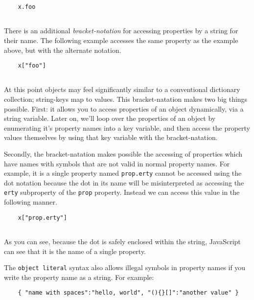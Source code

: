 \documentclass[11pt,letter]{book}
\begin{document}
    \begin{verbatim}
    x.foo
    
    \end{verbatim}
    
    There is an additional \emph{bracket-notation} for accessing properties by a string for their 
    name. The following example accesses the same property as the example above, but with the 
    alternate notation.
    
    \begin{verbatim}
    x["foo"]
    
    \end{verbatim}
    
    At this point objects may feel significantly similar to a conventional dictionary collection;
    string-keys map to values. This bracket-natation makes two big things possible. First: it allows 
    you to access properties of an object dynamically, via a string variable. Later on, we'll loop
    over the properties of an object by enumerating it's property names into a key variable, and 
    then access the property values themselves by using that key variable with the bracket-natation.
    
    Secondly, the bracket-natation makes possible the accessing of properties which have names with 
    symbols that are not valid in normal property names. For example, it is a single property named 
    \texttt{prop.erty} cannot be accessed using the dot notation because the dot in its name will be
    misinterpreted as accessing the \texttt{erty} subproperty of the \texttt{prop} property. Instead
    we can access this value in the following manner.
    
    \begin{verbatim}
    x["prop.erty"]
    
    \end{verbatim}
    
    As you can see, because the dot is safely enclosed within the string, JavaScript can see that it 
    is the name of a single property.
    
    The \texttt{object literal} syntax also allows illegal symbols in property names if you write
    the property name as a string. For example:
    
    \begin{verbatim}
    { "name with spaces":"hello, world", "(){}[]":"another value" }
    
    \end{verbatim}
    
\end{document}
